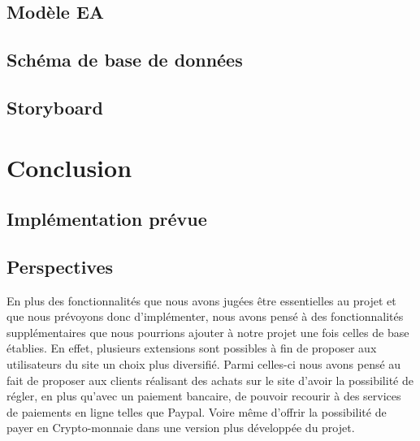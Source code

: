 \documentclass[a4paper,12pt]{book}
\theoremstyle{break}
\theoremstyle{break}
\theoremstyle{definition}
\theoremstyle{remark}
\begin{document}
\section{Modèle EA}

\section{Schéma de base de données}

\section{Storyboard}

\chapter{Conclusion}
\section{Implémentation prévue}

\section{Perspectives}
  En plus des fonctionnalités que nous avons jugées être essentielles au projet et que nous prévoyons donc d'implémenter, nous avons pensé à des fonctionnalités supplémentaires que nous pourrions ajouter à notre projet une fois celles de base établies. 
  En effet, plusieurs extensions sont possibles à fin de proposer aux utilisateurs du site un choix plus diversifié.
   Parmi celles-ci nous avons pensé au fait de proposer aux clients réalisant des achats sur le site d'avoir la possibilité de régler, en plus qu'avec un paiement bancaire, de pouvoir recourir à des services de paiements en ligne telles que Paypal.
  Voire même d'offrir la possibilité de payer en Crypto-monnaie dans une version plus développée du projet.
\end{document}
